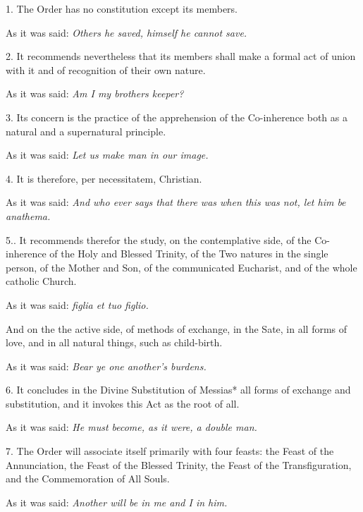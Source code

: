 1. The Order has no constitution except its members.

As it was said: \emph{Others he saved, himself he cannot save.}

2. It recommends nevertheless that its members shall make a formal act of union with it and of recognition of their own nature.

As it was said: \emph{Am I my brothers keeper?}

3. Its concern is the practice of the apprehension of the Co-inherence both as a natural and a supernatural principle.

As it was said: \emph{Let us make man in our image.}

4. It is therefore, per necessitatem, Christian.

As it was said: \emph{And who ever says that there was when this was not, let him be anathema.}

5.. It recommends therefor the study, on the contemplative side, of the Co-inherence of the Holy and Blessed Trinity, of the Two natures in the single person, of the Mother and Son, of the communicated Eucharist, and of the whole catholic Church.

As it was said: \emph{figlia et tuo figlio.}

And on the the active side, of methods of exchange, in the Sate, in all forms of love, and in all natural things, such as child-birth.

As it was said: \emph{Bear ye one another's burdens.}

6. It concludes in the Divine Substitution of Messias* all forms of exchange and substitution, and it invokes this Act as the root of all.

As it was said: \emph{He must become, as it were, a double man.}

7. The Order will associate itself primarily with four feasts: the Feast of the Annunciation, the Feast of the Blessed Trinity, the Feast of the Transfiguration, and the Commemoration of All Souls.

As it was said: \emph{Another will be in me and I in him.}